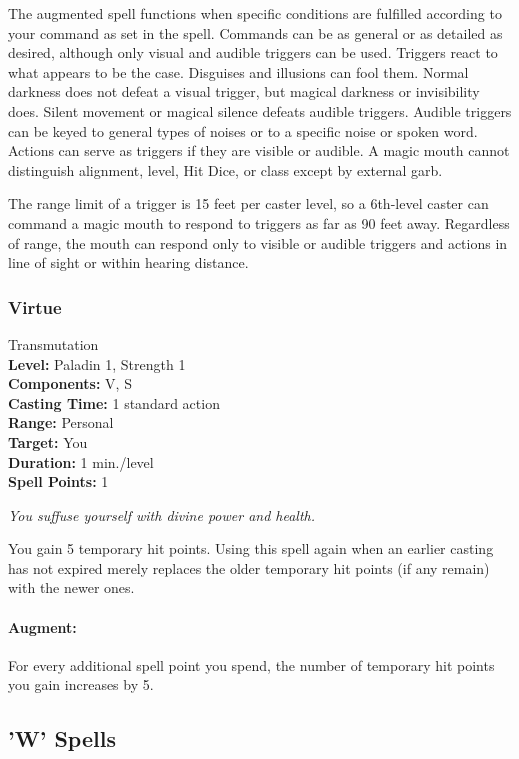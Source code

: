 The augmented spell functions when specific conditions are fulfilled according to your command as set in the spell. 
Commands can be as general or as detailed as desired, although only visual and audible triggers can be used. 
Triggers react to what appears to be the case. 
Disguises and illusions can fool them. 
Normal darkness does not defeat a visual trigger, but magical darkness or invisibility does. 
Silent movement or magical silence defeats audible triggers. 
Audible triggers can be keyed to general types of noises or to a specific noise or spoken word. 
Actions can serve as triggers if they are visible or audible. 
A magic mouth cannot distinguish alignment, level, Hit Dice, or class except by external garb.

The range limit of a trigger is 15 feet per caster level, so a 6th-level caster can command a magic mouth to respond to triggers as far as 90 feet away. 
Regardless of range, the mouth can respond only to visible or audible triggers and actions in line of sight or within hearing distance.

\subsubsection{Virtue}
\label{Spell:Virtue}
Transmutation
\\ \textbf{Level:} Paladin 1, Strength 1
\\ \textbf{Components:} V, S
\\ \textbf{Casting Time:} 1 standard action
\\ \textbf{Range:} Personal
\\ \textbf{Target:} You
\\ \textbf{Duration:} 1 min./level
\\ \textbf{Spell Points:} 1

\emph{You suffuse yourself with divine power and health.}

You gain 5 temporary hit points.
Using this spell again when an earlier casting has not expired merely replaces the older temporary hit points (if any remain) with the newer ones.

\paragraph{Augment:} For every additional spell point you spend, the number of temporary hit points you gain increases by 5.
\subsection{'W' Spells}
